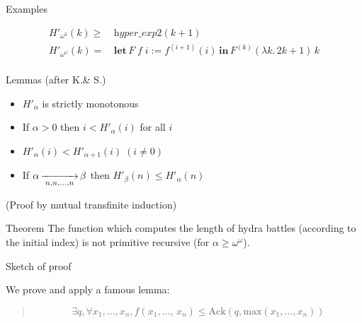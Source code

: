 \documentclass[10pt, fleqn]{beamer}
\begin{document}
\begin{frame}[fragile]
  \begin{block}{Examples}
         
      {\color{mathcolor}
      
    \begin{align*}
      H'_{\omega^3}(k) \geq\, & \textit{hyper\_exp2}(k+1) \\
      H'_{\omega^\omega}(k)=\,& \textbf{let}\,F\;f\;i := f^{(i+1)}(i)\,
                      \textbf{in}\, F^{(k)}(\lambda k.\,2k+1)\,k\\
    \end{align*}
       }%
  \end{block}
  

\begin{block}{Lemmas (after K.\& S.)}
   \begin{itemize} 
    \item \textcolor{mathcolor}{$H'_\alpha$} is strictly monotonous
    
     \item  If $\alpha>0$ then \textcolor{mathcolor}{$ i < H'_\alpha(i)$} for all $i$
    
    \item   $H'_\alpha(i) < H'_{\alpha+1}(i) \; (i \not=0)$
    
       \item     If \textcolor{mathcolor}{$\alpha \rplus{n,n,\dots,n} \beta$} then \textcolor{mathcolor}{$H'_\beta(n)\leq H'_\alpha(n)$} 
         

       \end{itemize}
       (Proof by mutual transfinite induction)
 \end{block}  
  
    
\end{frame}
 




\begin{frame}
  
  \begin{block}{Theorem}
    The function which computes the length of hydra battles
    (according to the initial index) is not primitive recursive
    (for $\alpha\geq \omega^\omega$).
    \vspace{4pt}
  \end{block}
  
  \begin{block}{Sketch of proof}

    We prove and apply a famous lemma:
    
       \begin{quote}
   
      {\color{mathcolor}
        \[
          \exists q, \forall x_1,\dots,x_n, 
          f(x_1,\dots,\,x_n)\leq\textrm{Ack}(q,\textrm{max}(x_1,\dots,x_n))
        \]}
    \end{quote}

    \end{block}
 




  
\end{frame}
\end{document}

